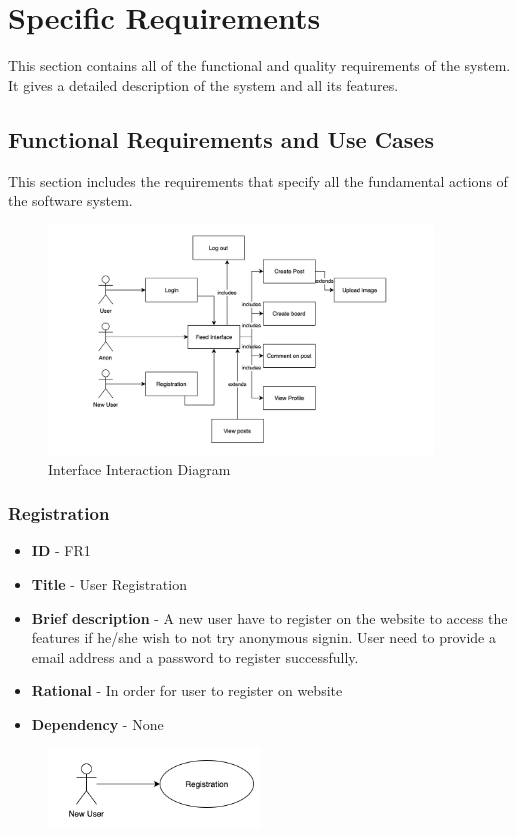 \documentclass[12pt]{report}
\begin{document}
\chapter{Specific Requirements}
This section contains all of the functional and quality requirements of the system. It gives a detailed description of the system and all its features.

\section{Functional Requirements and Use Cases}
This section includes the requirements that specify all the fundamental actions of the software system.
\begin{figure}[h]
\centering
\includegraphics[width=0.91\textwidth]{diagram.png}
\caption{Interface Interaction Diagram}
\end{figure}

\subsection{Registration}
\begin{itemize}
    \item \textbf{ID} - FR1
    \item \textbf{Title} - User Registration
    \item \textbf{Brief description} - A new user have to register on the website to access the features if he/she wish to not try anonymous signin. User need to provide a email address and a password to register successfully.
    \item \textbf{Rational} - In order for user to register on website
    \item \textbf{Dependency} - None
\end{itemize}
\begin{figure}[h]
\includegraphics[width=0.5\textwidth]{registration.png}
\end{figure}
\end{document}

